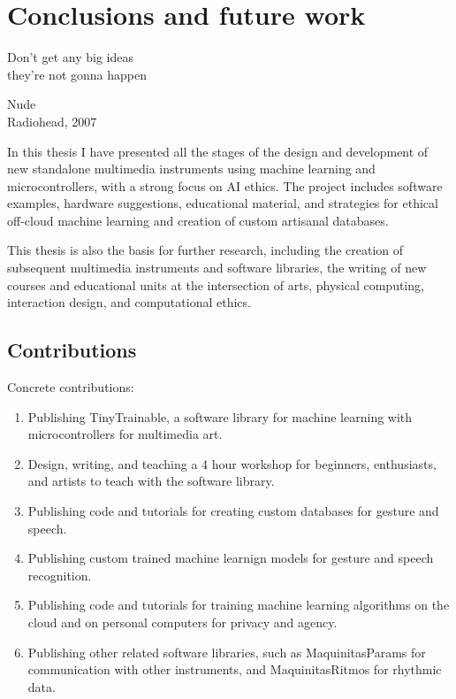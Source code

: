 \chapter{Conclusions and future work}

\epigraph{Don't get any big ideas \\ they're not gonna happen}{Nude \\ Radiohead, 2007}

In this thesis I have presented all the stages of the design and development of new standalone multimedia instruments using machine learning and microcontrollers, with a strong focus on AI ethics. The project includes software examples, hardware suggestions, educational material, and strategies for ethical off-cloud machine learning and creation of custom artisanal databases.

This thesis is also the basis for further research, including the creation of subsequent multimedia instruments and software libraries, the writing of new courses and educational units at the intersection of arts, physical computing, interaction design, and computational ethics.

\section{Contributions}

Concrete contributions:

\begin{enumerate}
  \item Publishing TinyTrainable, a software library for machine learning with microcontrollers for multimedia art.
  \item Design, writing, and teaching a 4 hour workshop for beginners, enthusiasts, and artists to teach with the software library.
  \item Publishing code and tutorials for creating custom databases for gesture and speech.
  \item Publishing custom trained machine learnign models for gesture and speech recognition.
  \item Publishing code and tutorials for training machine learning algorithms on the cloud and on personal computers for privacy and agency.
  \item Publishing other related software libraries, such as MaquinitasParams for communication with other instruments, and MaquinitasRitmos for rhythmic data.
\end{enumerate}

